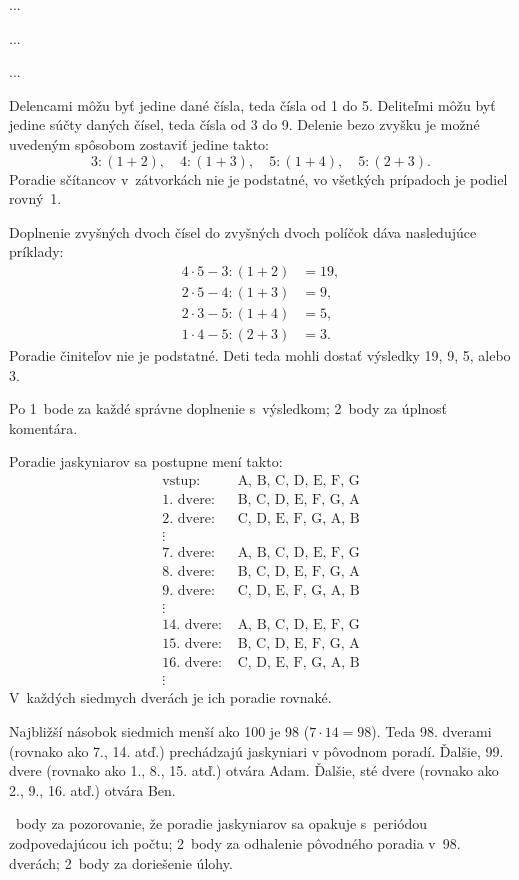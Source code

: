 {%
...}

{%
...}

{%
...}

{%
Delencami môžu byť jedine dané čísla, teda čísla od 1 do 5.
Deliteľmi môžu byť jedine súčty daných čísel, teda čísla od 3 do 9.
Delenie bezo zvyšku je možné uvedeným spôsobom zostaviť jedine takto:
$$
	3:(1+2), \quad
	4:(1+3), \quad
	5:(1+4), \quad
	5:(2+3).
$$
Poradie sčítancov v~zátvorkách nie je podstatné, vo všetkých prípadoch je podiel rovný~1.

Doplnenie zvyšných dvoch čísel do zvyšných dvoch políčok dáva nasledujúce príklady:
$$
\begin{aligned}
	4\cdot5-3:(1+2) &=19, \\
	2\cdot5-4:(1+3) &= 9, \\
	2\cdot3-5:(1+4) &= 5, \\
	1\cdot4-5:(2+3) &= 3.
\end{aligned}
$$
Poradie činiteľov nie je podstatné.
Deti teda mohli dostať výsledky 19, 9, 5, alebo 3.

\hodnotenie
Po 1~bode za každé správne doplnenie s~výsledkom;
2~body za úplnosť komentára.
\endhodnotenie
}

{%
Poradie jaskyniarov sa postupne mení takto:
$$
\begin{aligned}
	\text{vstup: } & \text{A, B, C, D, E, F, G} \\
	\text{1. dvere: } & \text{B, C, D, E, F, G, A} \\
	\text{2. dvere: } & \text{C, D, E, F, G, A, B} \\
	\vdots \ & \\
	\text{7. dvere: } & \text{A, B, C, D, E, F, G} \\
	\text{8. dvere: } & \text{B, C, D, E, F, G, A} \\
	\text{9. dvere: } & \text{C, D, E, F, G, A, B} \\
	\vdots \ & \\
	\text{14. dvere: } & \text{A, B, C, D, E, F, G} \\
	\text{15. dvere: } & \text{B, C, D, E, F, G, A} \\
	\text{16. dvere: } & \text{C, D, E, F, G, A, B} \\
	\vdots \ &
\end{aligned}
$$
V~každých siedmych dverách je ich poradie rovnaké.

Najbližší násobok siedmich menší ako 100 je 98 ($7\cdot14=98$).
Teda 98. dverami (rovnako ako 7., 14. atď.) prechádzajú jaskyniari v pôvodnom poradí.
Ďalšie, 99. dvere (rovnako ako 1., 8., 15. atď.) otvára Adam.
Ďalšie, sté dvere (rovnako ako 2., 9., 16. atď.) otvára Ben.

~body za pozorovanie, že poradie jaskyniarov sa opakuje s~periódou zodpovedajúcou ich počtu;
2~body za odhalenie pôvodného poradia v~98. dverách;
2~body za doriešenie úlohy.
\endhodnotenie}

